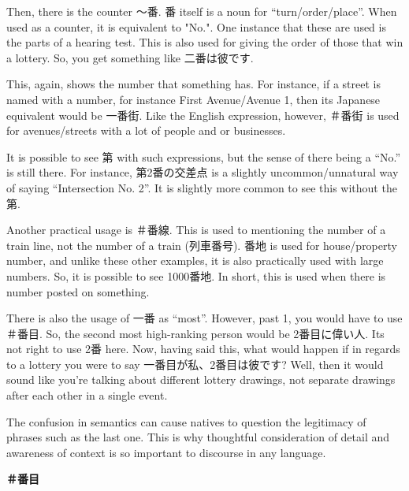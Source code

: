 \par{ Then, there is the counter ～番. 番 itself is a noun for “turn\slash order\slash place”. When used as a counter, it is equivalent to "No.". One instance that these are used is the parts of a hearing test. This is also used for giving the order of those that win a lottery. So, you get something like 二番は彼です. }

\par{ This, again, shows the number that something has. For instance, if a street is named with a number, for instance First Avenue\slash Avenue 1, then its Japanese equivalent would be 一番街. Like the English expression, however, ＃番街 is used for avenues\slash streets with a lot of people and or businesses. }

\par{ It is possible to see 第 with such expressions, but the sense of there being a “No.” is still there. For instance, 第2番の交差点 is a slightly uncommon\slash unnatural way of saying “Intersection No. 2”. It is slightly more common to see this without the 第. }

\par{ Another practical usage is ＃番線. This is used to mentioning the number of a train line, not the number of a train (列車番号). 番地 is used for house\slash property number, and unlike these other examples, it is also practically used with large numbers. So, it is possible to see 1000番地. In short, this is used when there is number posted on something. }

\par{ There is also the usage of 一番 as “most”. However, past 1, you would have to use ＃番目. So, the second most high-ranking person would be 2番目に偉い人. It\textquotesingle s not right to use 2番 here. Now, having said this, what would happen if in regards to a lottery you were to say 一番目が私、2番目は彼です? Well, then it would sound like you're talking about different lottery drawings, not separate drawings after each other in a single event. }

\par{ The confusion in semantics can cause natives to question the legitimacy of phrases such as the last one. This is why thoughtful consideration of detail and awareness of context is so important to discourse in any language. }

\begin{center}
 \textbf{＃番目 }
\end{center}

